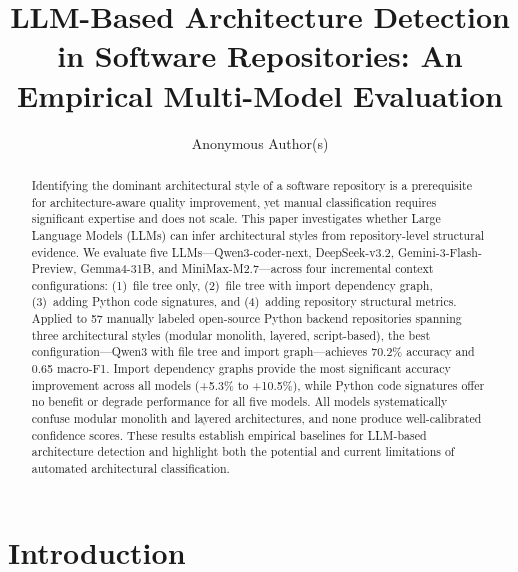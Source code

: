 \documentclass[runningheads]{llncs}
\begin{document}
\title{LLM-Based Architecture Detection in Software Repositories: An Empirical Multi-Model Evaluation}


\author{Anonymous Author(s)}


\maketitle

\begin{abstract}
Identifying the dominant architectural style of a software repository is a prerequisite for architecture-aware quality improvement, yet manual classification requires significant expertise and does not scale. This paper investigates whether Large Language Models (LLMs) can infer architectural styles from repository-level structural evidence. We evaluate five LLMs---Qwen3-coder-next, DeepSeek-v3.2, Gemini-3-Flash-Preview, Gemma4-31B, and MiniMax-M2.7---across four incremental context configurations: (1)~file tree only, (2)~file tree with import dependency graph, (3)~adding Python code signatures, and (4)~adding repository structural metrics. Applied to 57 manually labeled open-source Python backend repositories spanning three architectural styles (modular monolith, layered, script-based), the best configuration---Qwen3 with file tree and import graph---achieves 70.2\% accuracy and 0.65 macro-F1. Import dependency graphs provide the most significant accuracy improvement across all models (+5.3\% to +10.5\%), while Python code signatures offer no benefit or degrade performance for all five models. All models systematically confuse modular monolith and layered architectures, and none produce well-calibrated confidence scores. These results establish empirical baselines for LLM-based architecture detection and highlight both the potential and current limitations of automated architectural classification.
\end{abstract}

\section{Introduction}
\end{document}
